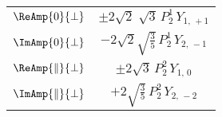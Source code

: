 \begin{table}[p]
\begin{tabular}{cc}
    $\ReAmp{0}{\perp}$  &
      $\pm 2\sqrt{2}\;\sqrt{3}\, P_2^1\, Y_{1,\,+1}$  \\

    $\ImAmp{0}{\perp}$  &
      $-2\sqrt{2}\sqrt{\tfrac{3}{5}}\, P_2^1\, Y_{2,\,-1}$  \\

    $\ReAmp{\parallel}{\perp}$  &
      $\pm 2\sqrt{3}\, P_2^2\, Y_{1,\,0}$  \\

    $\ImAmp{\parallel}{\perp}$  &
      $+2\sqrt{\tfrac{3}{5}}\, P_2^2\, Y_{2,\,-2}$  \\
    \hline
  \end{tabular}
\end{table}

